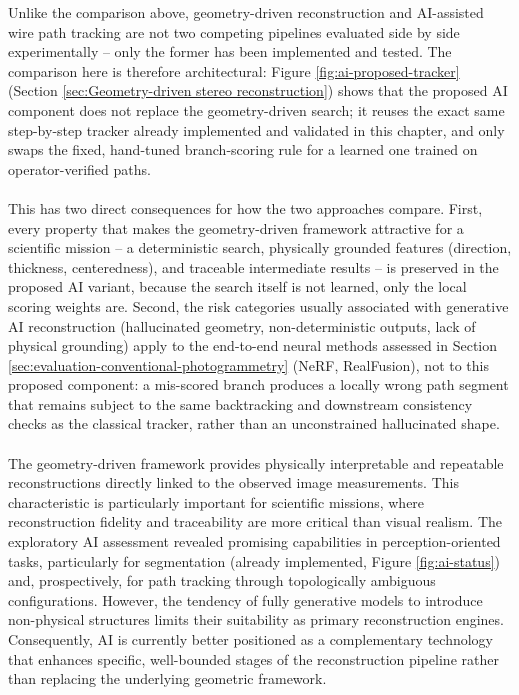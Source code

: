 Unlike the comparison above, geometry-driven reconstruction and AI-assisted wire path tracking are not two competing pipelines evaluated side by side experimentally -- only the former has been implemented and tested. The comparison here is therefore architectural: Figure \ref{fig:ai-proposed-tracker} (Section \ref{sec:Geometry-driven stereo reconstruction}) shows that the proposed AI component does not replace the geometry-driven search; it reuses the exact same step-by-step tracker already implemented and validated in this chapter, and only swaps the fixed, hand-tuned branch-scoring rule for a learned one trained on operator-verified paths.
\\\\
This has two direct consequences for how the two approaches compare. First, every property that makes the geometry-driven framework attractive for a scientific mission -- a deterministic search, physically grounded features (direction, thickness, centeredness), and traceable intermediate results -- is preserved in the proposed AI variant, because the search itself is not learned, only the local scoring weights are. Second, the risk categories usually associated with generative AI reconstruction (hallucinated geometry, non-deterministic outputs, lack of physical grounding) apply to the end-to-end neural methods assessed in Section \ref{sec:evaluation-conventional-photogrammetry} (NeRF, RealFusion), not to this proposed component: a mis-scored branch produces a locally wrong path segment that remains subject to the same backtracking and downstream consistency checks as the classical tracker, rather than an unconstrained hallucinated shape.
\\\\
The geometry-driven framework provides physically interpretable and repeatable reconstructions directly linked to the observed image measurements. This characteristic is particularly important for scientific missions, where reconstruction fidelity and traceability are more critical than visual realism. The exploratory AI assessment revealed promising capabilities in perception-oriented tasks, particularly for segmentation (already implemented, Figure \ref{fig:ai-status}) and, prospectively, for path tracking through topologically ambiguous configurations. However, the tendency of fully generative models to introduce non-physical structures limits their suitability as primary reconstruction engines. Consequently, AI is currently better positioned as a complementary technology that enhances specific, well-bounded stages of the reconstruction pipeline rather than replacing the underlying geometric framework.

